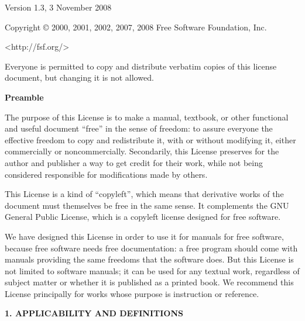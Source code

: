 \documentclass[10pt,a4paper,ngerman,titlepage,tocindentauto]{article}
\begin{document}
			\begin{multicols}{3}
				{\tiny
					\begin{center}
							 Version 1.3, 3 November 2008

					 Copyright \copyright{} 2000, 2001, 2002, 2007, 2008  Free Software Foundation, Inc.
					 
					 \bigskip
					 
						  <http://fsf.org/>
					  
					 \bigskip
					 
					 Everyone is permitted to copy and distribute verbatim copies
					 of this license document, but changing it is not allowed.
					\end{center}


					\begin{center}
					{\bf Preamble}
					\end{center}

					The purpose of this License is to make a manual, textbook, or other
					functional and useful document ``free'' in the sense of freedom: to
					assure everyone the effective freedom to copy and redistribute it,
					with or without modifying it, either commercially or noncommercially.
					Secondarily, this License preserves for the author and publisher a way
					to get credit for their work, while not being considered responsible
					for modifications made by others.

					This License is a kind of ``copyleft'', which means that derivative
					works of the document must themselves be free in the same sense.  It
					complements the GNU General Public License, which is a copyleft
					license designed for free software.

					We have designed this License in order to use it for manuals for free
					software, because free software needs free documentation: a free
					program should come with manuals providing the same freedoms that the
					software does.  But this License is not limited to software manuals;
					it can be used for any textual work, regardless of subject matter or
					whether it is published as a printed book.  We recommend this License
					principally for works whose purpose is instruction or reference.


					\begin{center}
					{\bf 1. APPLICABILITY AND DEFINITIONS\par}
					\end{center}

}
\end{multicols}
\end{document}

